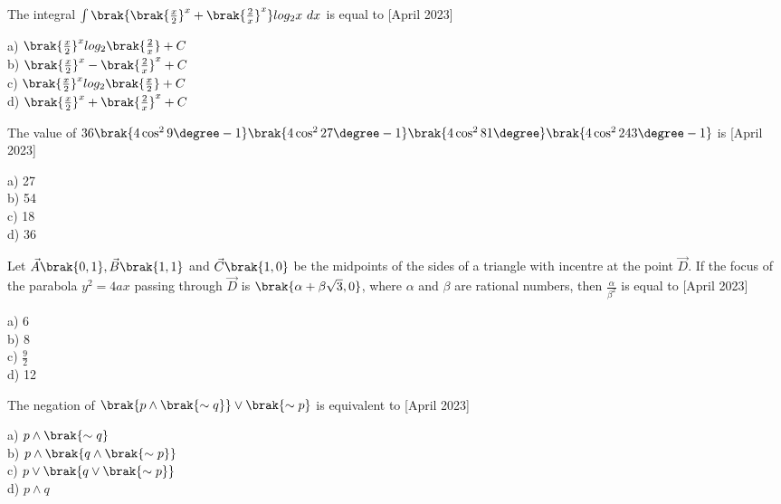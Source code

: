 \iffalse
\title{April 2023, Shift - 2}
\author{EE24BTECH11062}	
\section{mcq-single}
\fi
   
\item The integral $\int \brak{\brak{\frac{x}{2}}^x+\brak{\frac{2}{x}}^x}log_2 x\ dx$ is equal to \hfill{[April 2023]}
\begin{multicols}{4}
    a) $\brak{\frac{x}{2}}^x log_2\brak{\frac{2}{x}}+C$\\
    b) $\brak{\frac{x}{2}}^x -\brak{\frac{2}{x}}^x+C$\\
    c) $\brak{\frac{x}{2}}^x log_2\brak{\frac{x}{2}}+C$\\
    d)  $\brak{\frac{x}{2}}^x +\brak{\frac{2}{x}}^x+C$
\end{multicols}
 \item The value of $36\brak{4\cos^2 9\degree -1}\brak{4\cos^2 27\degree -1}\brak{4\cos^2 81\degree}\brak{4\cos^2 243\degree -1}$ is \hfill{[April 2023]}
 \begin{multicols}{4}
     a) 27\\
     b) 54\\
     c) 18\\
     d) 36
 \end{multicols}
 
 \item Let $\vec{A}\brak{0,1}, \vec{B}\brak{1,1}$ and $\vec{C}\brak{1,0}$ be the midpoints of the sides of a triangle with incentre at the point $\vec{D}$. If the focus of the parabola $y^2=4ax$ passing through $\vec{D}$ is $\brak{\alpha +\beta \sqrt{3},0}$, where $\alpha$ and $\beta$ are rational numbers, then $\frac{\alpha}{\beta^2}$ is equal to \hfill{[April 2023]}
 \begin{multicols}{4}
    a) 6\\
    b) 8\\
    c) $\frac{9}{2}$\\
    d) 12
 \end{multicols}
 
\item The negation of $\brak{p \land \brak{\sim q}} \lor \brak{\sim p}
$ is equivalent to \hfill{[April 2023]}
\begin{multicols}{4}
    a) $p \land \brak{\sim q}$\\
    b) $p \land \brak{q \land \brak{\sim p}}$\\
    c)  $p \lor \brak{q \lor \brak{\sim p}}$\\
    d) $p\land q$
\end{multicols}

